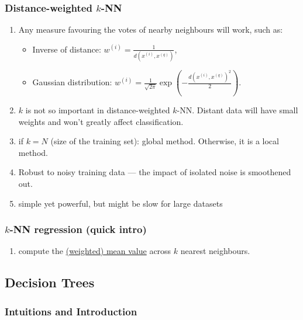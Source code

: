 \documentclass[twocolumn,landscape,10pt]{article}
\theoremstyle{definition}
\begin{document}
\subsubsection{Distance-weighted $k$-NN}

\begin{enumerate}
    \item Any measure favouring the votes of nearby neighbours will work, such
        as:
        \begin{itemize}
            \item Inverse of distance: $w^{(i)}=\frac{1}{d(x^{(i)},x^{(q)})}$,
            \item Gaussian distribution:
                $w^{(i)}=\frac{1}{\sqrt{2\pi}}\exp\left(-\frac{d(x^{(i)},x^{(q)})^{2}}{2}\right)$.
        \end{itemize} 
    \item $k$ is not so important in distance-weighted $k$-NN. Distant data will
        have small weights and won't greatly affect classification.
    \item if $k=N$ (size of the training set): global method. Otherwise, it is a
        local method.
    \item Robust to noisy training data --- the impact of isolated noise is
        smoothened out.
    \item simple yet powerful, but might be slow for large datasets
\end{enumerate} 

\subsubsection{$k$-NN regression (quick intro)}

\begin{enumerate}
    \item compute the \underline{(weighted) mean value} across $k$ nearest neighbours.
\end{enumerate} 

\subsection{Decision Trees}

\subsubsection{Intuitions and Introduction}
\end{document}
